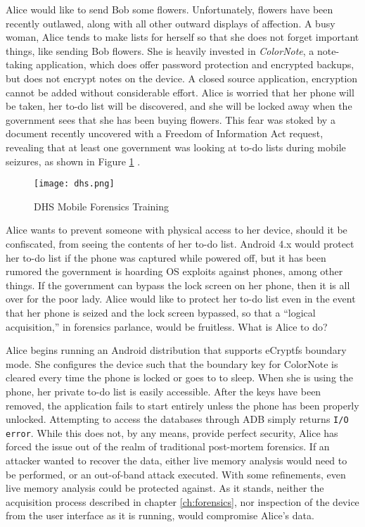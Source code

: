 Alice would like to send Bob some flowers. Unfortunately, flowers have been recently outlawed, along with all other outward displays
of affection. A busy woman, Alice tends to make lists for herself so that she does not forget important things, like sending Bob
flowers. She is heavily invested in \emph{ColorNote}, a note-taking application, which does offer password protection and encrypted
backups, but does not encrypt notes on the device. A closed source application, encryption cannot be added without considerable
effort. Alice is worried that her phone will be taken, her to-do list will be discovered, and she will be locked away when the
government sees that she has been buying flowers. This fear was stoked by a document recently uncovered with a Freedom of
Information Act request, revealing that at least one government was looking at to-do lists during mobile seizures, as shown in
Figure \ref{fig:dhs} \cite{dhsfoia}. 
\begin{figure}[!h]
\begin{center}
\texttt{[image: dhs.png]}
\end{center}
\caption{DHS Mobile Forensics Training} 
\label{fig:dhs}
\end{figure}
Alice wants to prevent someone with physical access to her device, should it be confiscated,
from seeing the contents of her to-do list. Android 4.x would protect her to-do list if the phone was captured while powered off, but
it has been rumored the government is hoarding OS exploits against phones, among other things. If the government can bypass the lock
screen on her phone, then it is all over for the poor lady. Alice would like to protect her to-do list even in the event that her
phone is seized and the lock screen bypassed, so that a ``logical acquisition,'' in forensics parlance, would be fruitless.
What is Alice to do?


Alice begins running an Android distribution that supports eCryptfs boundary mode. She configures the device such that the boundary
key for ColorNote is cleared every time the phone is locked or goes to to sleep. When she is using the phone, her private to-do list
is easily accessible. After the keys have been removed, the application fails to start entirely unless the phone has been properly
unlocked. Attempting to access the databases through ADB simply returns \texttt{I/O error}. While this does not, by any means,
provide perfect security, Alice has forced the issue out of the realm of traditional post-mortem forensics. If an attacker wanted to
recover the data, either live memory analysis would need to be performed, or an out-of-band attack executed. With some refinements,
even live memory analysis could be protected against.  As it stands, neither the acquisition process described in chapter
\ref{ch:forensics}, nor inspection of the device from the user interface as it is running, would compromise Alice's data.
